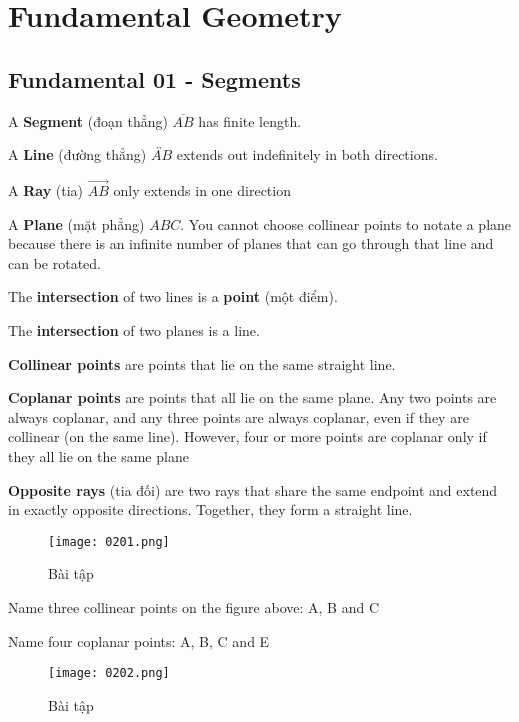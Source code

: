 \chapter{Fundamental Geometry}

\section{Fundamental 01 - Segments}

A \textbf{Segment} (đoạn thẳng) $\overline{AB}$ has finite length.

A \textbf{Line} (đường thẳng) $\overleftrightarrow{AB}$ extends out indefinitely in both directions.

A \textbf{Ray} (tia) $\overrightarrow{AB}$ only extends in one direction

A \textbf{Plane} (mặt phẳng) $ABC$. You cannot choose collinear points to notate a plane because there is an infinite number of planes that can go through that line and can be rotated.

The \textbf{intersection} of two lines is a \textbf{point} (một điểm).

The \textbf{intersection} of two planes is a line.

\textbf{Collinear points} are points that lie on the same straight line.

\textbf{Coplanar points} are points that all lie on the same plane. Any two points are always coplanar, and any three points are always coplanar, even if they are collinear (on the same line). However, four or more points are coplanar only if they all lie on the same plane

\textbf{Opposite rays} (tia đối) are two rays that share the same endpoint and extend in exactly opposite directions. Together, they form a straight line.

\newpage

\begin{figure}[ht]
  \centering
  \texttt{[image: 0201.png]}
  \caption{Bài tập}
\end{figure}

Name three collinear points on the figure above: A, B and C

Name four coplanar points: A, B, C and E

\vspace{10 mm}

\begin{figure}[ht]
  \centering
  \texttt{[image: 0202.png]}
  \caption{Bài tập}
\end{figure}

